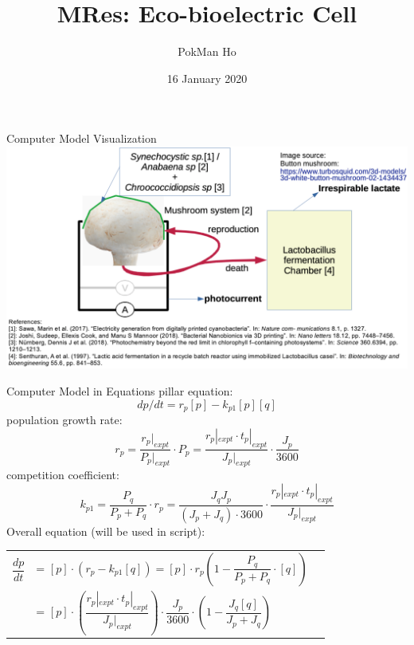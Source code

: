 \documentclass[xcolor=x11names,compress]{beamer}
\title{MRes: Eco-bioelectric Cell}
\author{PokMan Ho}
\date{16 January 2020}
\begin{document}
\begin{frame}
    \maketitle
\end{frame}

\begin{frame}{Computer Model Visualization}
    \includegraphics[width=\linewidth]{figure/proposed_model.png}
\end{frame}

\begin{frame}{Computer Model in Equations}
    pillar equation:
    \begin{equation}\label{eq:main}
        dp/dt = r_p [p] - k_{p1} [p][q]
    \end{equation}
    population growth rate:
    \begin{equation}\label{eq:growth}
        r_p = \dfrac{r_p|_{expt}}{P_p|_{expt}}\cdot P_p = \dfrac{r_p|_{expt}\cdot t_p|_{expt}}{J_p|_{expt}}\cdot\dfrac{J_p}{3600}
    \end{equation}
    competition coefficient:
    \begin{equation}\label{eq:compete}
        k_{p1} = \dfrac{P_q}{P_p + P_q}\cdot r_p = \dfrac{J_q J_p}{(J_p + J_q)\cdot3600}\cdot \dfrac{r_p|_{expt}\cdot t_p|_{expt}}{J_p|_{expt}}
    \end{equation}
    Overall equation (will be used in script):
    \begin{tabular}{rll}
        $\dfrac{dp}{dt}$ & = $[p]\cdot(r_p - k_{p1}[q]) = [p]\cdot r_p(1-\dfrac{P_q}{P_p + P_q}\cdot[q])$\\
         & = $[p]\cdot(\dfrac{r_p|_{expt}\cdot t_p|_{expt}}{J_p|_{expt}})\cdot\dfrac{J_p}{3600}\cdot(1-\dfrac{J_q[q]}{J_p + J_q})$
    \end{tabular}
\end{frame}
\end{document}
